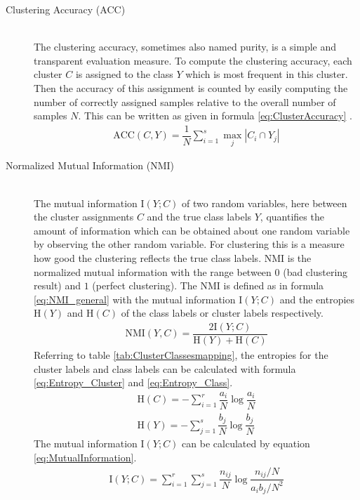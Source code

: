 \documentclass[12pt,DIV14,BCOR12mm,a4paper,footexclude,headinclude,halfparskip-,twoside,openright,cleardoubleempty,idxtotoc,bibtotoc,listtotoc,abstracton]{scrreprt} %
\numberwithin{equation}{chapter}
\begin{document}
\begin{description}
	\item[Clustering Accuracy (ACC)]\hfill \\
	The clustering accuracy, sometimes also named purity, is a simple and transparent evaluation measure. To compute the clustering accuracy, each cluster $C$ is assigned to the class $Y$ which is most frequent in this cluster. Then the accuracy of this assignment is counted by easily computing the number of correctly assigned samples relative to the overall number of samples $N$. This can be written as given in formula \ref{eq:ClusterAccuracy} \cite{Manning08InformationRetrieval}.
	\begin{align}
		\textrm{ACC}(C,Y) = \dfrac{1}{N}\sum_{i=1}^s\underset{j}\max|C_i\cap Y_j|\label{eq:ClusterAccuracy}
	\end{align}
	\item[Normalized Mutual Information (NMI)]\hfill \\
	The mutual information $\textrm{I}(Y;C)$ of two random variables, here between the cluster assignments $C$ and the true class labels $Y$, quantifies the amount of information which can be obtained about one random variable by observing the other random variable. For clustering this is a measure how good the clustering reflects the true class labels. NMI is the normalized mutual information with the range between $0$ (bad clustering result) and $1$ (perfect clustering). The NMI is defined as in formula \ref{eq:NMI_general} with the mutual information $\textrm{I}(Y;C)$ and the entropies $\textrm{H}(Y)$ and $\textrm{H}(C)$ of the class labels or cluster labels respectively.
	\begin{align}
		\textrm{NMI}(Y,C) = \dfrac{2\textrm{I}(Y;C)}{\textrm{H}(Y)+\textrm{H}(C)}\label{eq:NMI_general}
	\end{align}
	Referring to table \ref{tab:ClusterClassesmapping}, the entropies for the cluster labels and class labels can be calculated with formula \ref{eq:Entropy_Cluster} and \ref{eq:Entropy_Class}.
	\begin{align}
		\textrm{H}(C) = -\sum_{i=1}^r\dfrac{a_i}{N}\log\dfrac{a_i}{N}\label{eq:Entropy_Cluster}\\
		\textrm{H}(Y) = -\sum_{j=1}^s\dfrac{b_j}{N}\log\dfrac{b_j}{N}\label{eq:Entropy_Class}
	\end{align}
	The mutual information $\textrm{I}(Y;C)$ can be calculated by equation \ref{eq:MutualInformation}.
	\begin{align}
		\textrm{I}(Y;C) = \sum_{i=1}^r\sum_{j=1}^s\dfrac{n_{ij}}{N}\log\dfrac{n_{ij}/N}{a_ib_j/N^2}\label{eq:MutualInformation}

\end{align}
\end{description}
\end{document}
